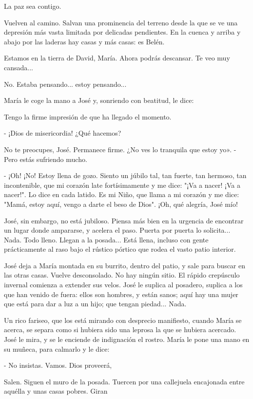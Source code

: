 \documentclass[12pt]{book} %
\begin{document}
La paz sea contigo. 

Vuelven al camino. Salvan una prominencia del terreno desde la que se ve una depresión más vasta limitada por delicadas pendientes. En la cuenca y arriba y abajo por las laderas hay casas y más casas: es Belén. 

Estamos en la tierra de David, María. Ahora podrás descansar. Te veo muy cansada... 

No. Estaba pensando... estoy pensando... 

María le coge la mano a José y, sonriendo con beatitud, le dice: 

Tengo la firme impresión de que ha llegado el momento. 

- ¡Dios de misericordia! ¿Qué hacemos? 

No te preocupes, José. Permanece firme. ¿No ves lo tranquila que estoy yo». - Pero estás sufriendo mucho. 

- ¡Oh! ¡No! Estoy llena de gozo. Siento un júbilo tal, tan fuerte, tan hermoso, tan incontenible, que mi corazón late fortísimamente y me dice: "¡Va a nacer! ¡Va a nacer!". Lo dice en cada latido. Es mi Niño, que llama a mi corazón y me dice: "Mamá, estoy aquí, vengo a darte el beso de Dios". ¡Oh, qué alegría, José mío! 

José, sin embargo, no está jubiloso. Piensa más bien en la urgencia de encontrar un lugar donde ampararse, y acelera el paso. Puerta por puerta lo solicita... Nada. Todo lleno. Llegan a la posada... Está llena, incluso con gente prácticamente al raso bajo el rústico pórtico que rodea el vasto patio interior. 

José deja a María montada en su burrito, dentro del patio, y sale para buscar en las otras casas. Vuelve desconsolado. No hay ningún sitio. El rápido crepúsculo invernal comienza a extender sus velos. José le suplica al posadero, suplica a los que han venido de fuera: ellos son hombres, y están sanos; aquí hay una mujer que está para dar a luz a un hijo; que tengan piedad... Nada. 

Un rico fariseo, que los está mirando con desprecio manifiesto, cuando María se acerca, se separa como si hubiera sido una leprosa la que se hubiera acercado. José le mira, y se le enciende de indignación el rostro. María le pone una mano en su muñeca, para calmarlo y le dice: 

- No insistas. Vamos. Dios proveerá, 

Salen. Siguen el muro de la posada. Tuercen por una callejuela encajonada entre aquélla y unas casas pobres. Giran 
\end{document}
